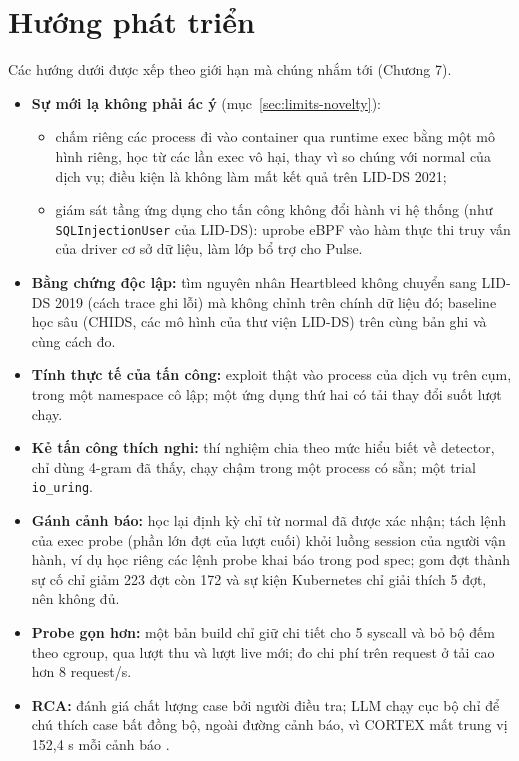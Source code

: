 \section{Hướng phát triển}

Các hướng dưới được xếp theo giới hạn mà chúng nhắm tới (Chương 7).

\begin{itemize}
\tightlist
\item
  \textbf{Sự mới lạ không phải ác ý} (mục~\ref{sec:limits-novelty}):
  \begin{itemize}
  \tightlist
  \item
    chấm riêng các process đi vào container qua runtime exec bằng một mô hình riêng, học từ các lần exec vô hại, thay vì so chúng với normal của dịch vụ; điều kiện là không làm mất kết quả trên LID-DS 2021;
  \item
    giám sát tầng ứng dụng cho tấn công không đổi hành vi hệ thống (như \texttt{SQLInjectionUser} của LID-DS): uprobe eBPF vào hàm thực thi truy vấn của driver cơ sở dữ liệu, làm lớp bổ trợ cho Pulse.
  \end{itemize}
\item
  \textbf{Bằng chứng độc lập:} tìm nguyên nhân Heartbleed không chuyển sang LID-DS 2019 (cách trace ghi lỗi) mà không chỉnh trên chính dữ liệu đó; baseline học sâu (CHIDS, các mô hình của thư viện LID-DS) trên cùng bản ghi và cùng cách đo.
\item
  \textbf{Tính thực tế của tấn công:} exploit thật vào process của dịch vụ trên cụm, trong một namespace cô lập; một ứng dụng thứ hai có tải thay đổi suốt lượt chạy.
\item
  \textbf{Kẻ tấn công thích nghi:} thí nghiệm chia theo mức hiểu biết về detector, chỉ dùng 4-gram đã thấy, chạy chậm trong một process có sẵn; một trial \texttt{io\_\allowbreak{}uring}.
\item
  \textbf{Gánh cảnh báo:} học lại định kỳ chỉ từ normal đã được xác nhận; tách lệnh của exec probe (phần lớn đợt của lượt cuối) khỏi luồng session của người vận hành, ví dụ học riêng các lệnh probe khai báo trong pod spec; gom đợt thành sự cố chỉ giảm 223 đợt còn 172 và sự kiện Kubernetes chỉ giải thích 5 đợt, nên không đủ.
\item
  \textbf{Probe gọn hơn:} một bản build chỉ giữ chi tiết cho 5 syscall và bỏ bộ đếm theo cgroup, qua lượt thu và lượt live mới; đo chi phí trên request ở tải cao hơn 8 request/s.
\item
  \textbf{RCA:} đánh giá chất lượng case bởi người điều tra; LLM chạy cục bộ chỉ để chú thích case bất đồng bộ, ngoài đường cảnh báo, vì CORTEX mất trung vị 152,4 s mỗi cảnh báo \citep{wei2025}.
\end{itemize}
